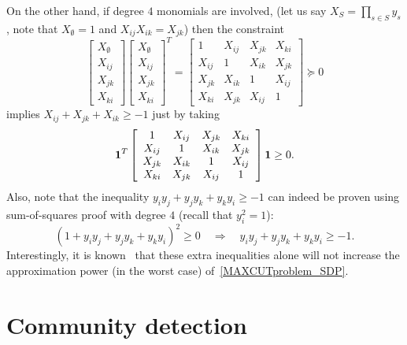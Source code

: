 \begin{remark}
On the other hand, if degree $4$ monomials are involved, (let us say $X_S = \prod_{s\in S} y_s$, note that $X_{\emptyset} =1$ and $X_{ij}X_{ik} = X_{jk}$) then the constraint
\[
\left[\begin{array}{c}
X_{\emptyset} \\
X_{ij} \\
X_{jk} \\
X_{ki}
\end{array}\right]
\left[\begin{array}{c}
X_{\emptyset} \\
X_{ij} \\
X_{jk} \\
X_{ki}
\end{array}\right]^T
= 
\left[\begin{array}{cccc}
1       & X_{ij} & X_{jk} & X_{ki} \\
X_{ij} & 1      & X_{ik} & X_{jk} \\
X_{jk} & X_{ik}& 1       & X_{ij} \\
X_{ki} & X_{jk} & X_{ij} & 1
\end{array}\right]
\succeq 0
\]
implies $X_{ij} + X_{jk} + X_{ik} \geq -1$ just by taking
\[
\mathbf{1}^T  \left[\begin{array}{cccc}
1       & X_{ij} & X_{jk} & X_{ki} \\
X_{ij} & 1      & X_{ik} & X_{jk} \\
X_{jk} & X_{ik}& 1       & X_{ij} \\
X_{ki} & X_{jk} & X_{ij} & 1
\end{array}\right]   \mathbf{1} \geq 0.
\]
Also, note that the inequality $y_iy_j + y_jy_k + y_ky_i \geq -1$ can indeed be proven using sum-of-squares proof with degree $4$ (recall that $y_i^2=1$):
\[
(1+y_iy_j+y_jy_k+y_ky_i)^2 \geq 0 \quad  \Rightarrow \quad y_iy_j + y_jy_k + y_ky_i \geq -1.
\]
Interestingly, it is known~\cite{Khot_Vishnoi_2013} that these extra inequalities alone will not increase the approximation power (in the worst case) of~\eqref{MAXCUTproblem_SDP}.
\end{remark}




\section{Community detection}\label{s:community}

